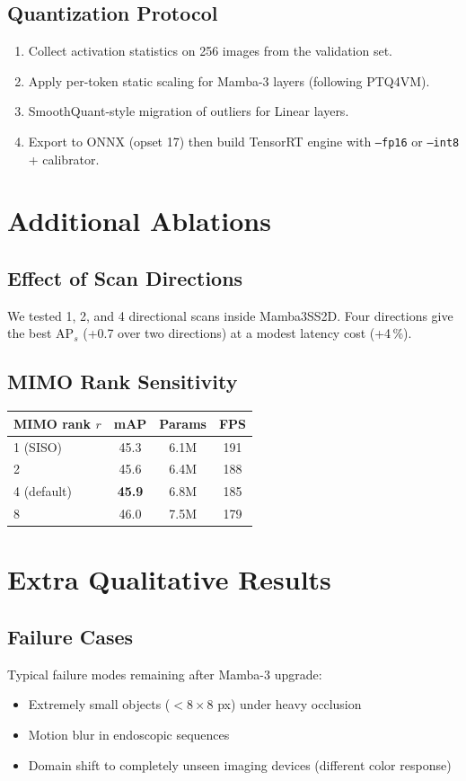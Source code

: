 \documentclass[11pt]{article}
\begin{document}
\subsection{Quantization Protocol}
\begin{enumerate}[leftmargin=*]
  \item Collect activation statistics on 256 images from the validation set.
  \item Apply per-token static scaling for Mamba-3 layers (following PTQ4VM).
  \item SmoothQuant-style migration of outliers for Linear layers.
  \item Export to ONNX (opset 17) then build TensorRT engine with \texttt{--fp16} or \texttt{--int8} + calibrator.
\end{enumerate}

\section{Additional Ablations}

\subsection{Effect of Scan Directions}
We tested 1, 2, and 4 directional scans inside Mamba3SS2D. Four directions give the best AP$_s$ (+0.7 over two directions) at a modest latency cost (+4\,\%).

\subsection{MIMO Rank Sensitivity}
\begin{center}
\begin{tabular}{lccc}
\toprule
MIMO rank $r$ & mAP & Params & FPS \\
\midrule
1 (SISO) & 45.3 & 6.1M & 191 \\
2        & 45.6 & 6.4M & 188 \\
4 (default) & \textbf{45.9} & 6.8M & 185 \\
8        & 46.0 & 7.5M & 179 \\
\bottomrule
\end{tabular}
\end{center}

\section{Extra Qualitative Results}

\subsection{Failure Cases}
Typical failure modes remaining after Mamba-3 upgrade:
\begin{itemize}[leftmargin=*]
  \item Extremely small objects ($<8\times8$ px) under heavy occlusion
  \item Motion blur in endoscopic sequences
  \item Domain shift to completely unseen imaging devices (different color response)
\end{itemize}
\end{document}
